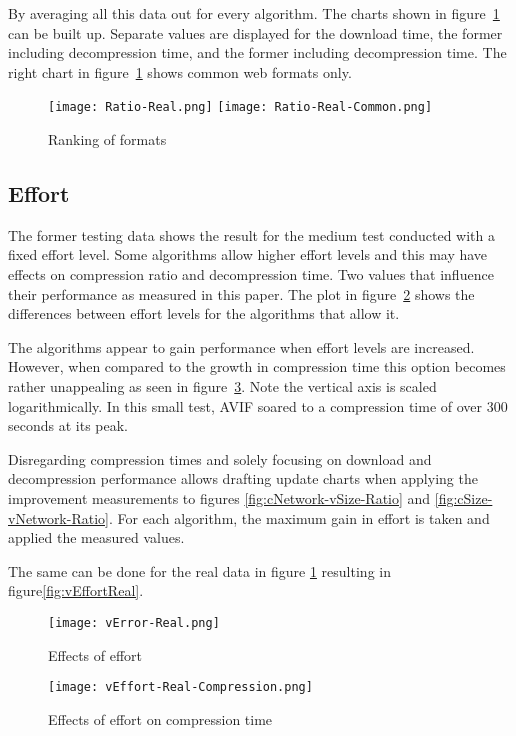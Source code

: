 \documentclass[11pt,a4paper]{report}
\begin{document}
By averaging all this data out for every algorithm. The charts shown in figure~\ref{fig:Real} can be built up. Separate values are displayed for the download time, the former including decompression time, and the former including decompression time. The right chart in figure~\ref{fig:Real} shows common web formats only.

\begin{figure}[!htb]
\centering
\texttt{[image: Ratio-Real.png]}
\texttt{[image: Ratio-Real-Common.png]}
\caption{\label{fig:Real} Ranking of formats}
\end{figure}

\newpage
\subsection{Effort}

The former testing data shows the result for the medium test conducted with a fixed effort level. Some algorithms allow higher effort levels and this may have effects on compression ratio and decompression time. Two values that influence their performance as measured in this paper. The plot in figure~\ref{fig:vEffort} shows the differences between effort levels for the algorithms that allow it.

The algorithms appear to gain performance when effort levels are increased. However, when compared to the growth in compression time this option becomes rather unappealing as seen in figure~\ref{fig:vEffortCompression}. Note the vertical axis is scaled logarithmically. In this small test, AVIF soared to a compression time of over 300 seconds at its peak. 

Disregarding compression times and solely focusing on download and decompression performance allows drafting update charts when applying the improvement measurements to figures \ref{fig:cNetwork-vSize-Ratio} and \ref{fig:cSize-vNetwork-Ratio}. For each algorithm, the maximum gain in effort is taken and applied the measured values. 

The same can be done for the real data in figure \ref{fig:Real} resulting in figure\ref{fig:vEffortReal}.

\begin{figure}[!htb]
\centering
\texttt{[image: vError-Real.png]}
\caption{\label{fig:vEffort} Effects of effort}
\end{figure}

\begin{figure}[!htb]
\centering
\texttt{[image: vEffort-Real-Compression.png]}
\caption{\label{fig:vEffortCompression} Effects of effort on compression time}
\end{figure}
\end{document}
